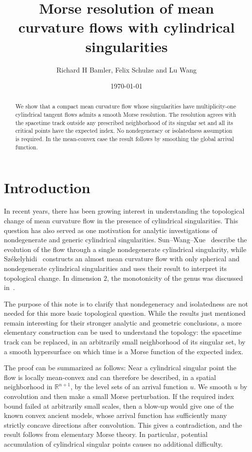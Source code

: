 \documentclass[12pt,twoside,reqno]{amsart}
\title[Morse resolution of flows with cylindrical singularities]{Morse resolution of mean curvature flows with cylindrical singularities}
\author{Richard H Bamler, Felix Schulze and Lu Wang}
\date{\today}
\newcommand{\IR}{\mathbb{R}}
\theoremstyle{definition}
\theoremstyle{remark}
\numberwithin{equation}{section}
\begin{document}
\begin{abstract}
We show that a compact mean curvature flow whose singularities have multiplicity-one cylindrical tangent flows admits a smooth Morse resolution.
The resolution agrees with the spacetime track outside any prescribed neighborhood of its singular set and all its critical points have the expected index.
No nondegeneracy or isolatedness assumption is required.
In the mean-convex case the result follows by smoothing the global arrival function.
\end{abstract}

\maketitle


\section{Introduction}

In recent years, there has been growing interest in understanding the topological change of mean curvature flow in the presence of cylindrical singularities.
This question has also served as one motivation for analytic investigations of nondegenerate and generic cylindrical singularities.
Sun--Wang--Xue~\cite{SunWangXue} describe the evolution of the flow through a single nondegenerate cylindrical singularity, while Sz\'ekelyhidi~\cite{Szekelyhidi} constructs an almost mean curvature flow with only spherical and nondegenerate cylindrical singularities and uses their result to interpret its topological change.
In dimension $2$, the monotonicity of the genus was discussed in~\cite{WhiteGenus}.

The purpose of this note is to clarify that nondegeneracy and isolatedness are not needed for this more basic topological question.
While the results just mentioned remain interesting for their stronger analytic and geometric conclusions, a more elementary construction can be used to understand the topology: the spacetime track can be replaced, in an arbitrarily small neighborhood of its singular set, by a smooth hypersurface on which time is a Morse function of the expected index.

The proof can be summarized as follows:
Near a cylindrical singular point the flow is locally mean-convex and can therefore be described, in a spatial neighborhood in $\IR^{n+1}$, by the level sets of an arrival function $u$.
We smooth $u$ by convolution and then make a small Morse perturbation.
If the required index bound failed at arbitrarily small scales, then a blow-up would give one of the known convex ancient models, whose arrival function has sufficiently many strictly concave directions after convolution.
This gives a contradiction, and the result follows from elementary Morse theory.
In particular, potential accumulation of cylindrical singular points causes no additional difficulty.
\end{document}
